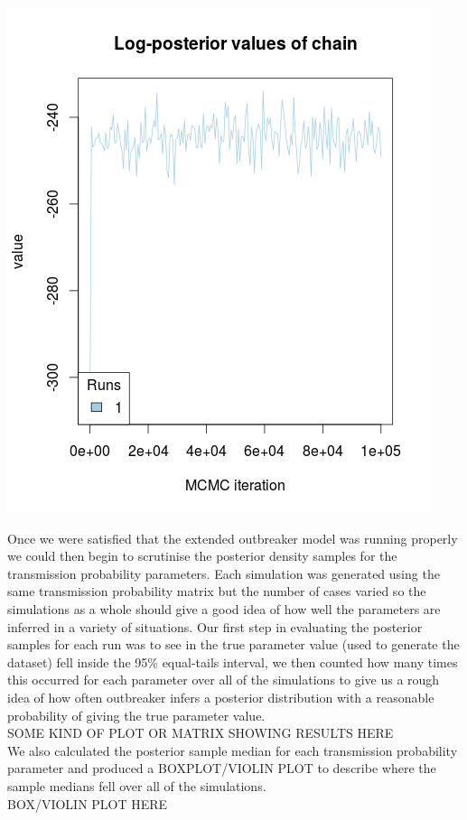 \documentclass[11pt,a4paper]{report}
\begin{document}
\begin{center}
\includegraphics[scale=0.6]{trace.png}
\end{center}
Once we were satisfied that the extended outbreaker model was running properly we could then begin to scrutinise the posterior density samples for the transmission probability parameters. Each simulation was generated using the same transmission probability matrix but the number of cases varied so the simulations as a whole should give a good idea of how well the parameters are inferred in a variety of situations. Our first step in evaluating the posterior samples for each run was to see in the true parameter value (used to generate the dataset) fell inside the 95\% equal-tails interval, we then counted how many times this occurred for each parameter over all of the simulations to give us a rough idea of how often outbreaker infers a posterior distribution with a reasonable probability of giving the true parameter value.
\\
SOME KIND OF PLOT OR MATRIX SHOWING RESULTS HERE
\\
We also calculated the posterior sample median for each transmission probability parameter and produced a BOXPLOT/VIOLIN PLOT to describe where the sample medians fell over all of the simulations.
\\
BOX/VIOLIN PLOT HERE
\\
\end{document}
